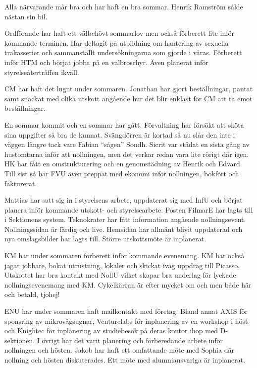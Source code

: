\documentclass[10pt]{article}
\begin{document}
\begin{paragrafer}
\begin{fyllnadsval}
\end{fyllnadsval}

\begin{paragrafer}
Alla närvarande mår bra och har haft en bra sommar. Henrik Ramström sålde nästan sin bil. 

Ordförande har haft ett välbehövt sommarlov men också förberett lite inför kommande terminen. 
Har deltagit på utbildning om hantering av sexuella trakasserier och sammanställt undersökningarna som gjorde i våras. 
Förberett inför HTM och börjat jobba på en valbroschyr. Även planerat inför styrelseåterträffen ikväll. 

CM har haft det lugnt under sommaren. Jonathan har gjort beställningar, pantat samt 
snackat med olika utskott angående hur det blir enklast för CM att ta emot beställningar.

En sommar kommit och en sommar har gått. Förvaltning har försökt att sköta sina uppgifter så bra de kunnat. Svängdörren är kortad så nu slår den inte i väggen längre tack vare Fabian “sågen” Sondh. 
Sicrit var städat en sista gång av hustomtarna inför att nollningen, men det verkar redan vara lite rörigt där igen. HK har fått en omstrukturering och en genomstädning av Henrik och Edvard. 
Till sist så har FVU även preppat med ekonomi inför nollningen, bokfört och fakturerat. 

Mattias har satt sig in i styrelsens arbete, uppdaterat sig med InfU och börjat planera inför kommande utskott- och styrelsearbete. Posten FilmarE har lagts till i Sektionens system. Teknokrater har fått information angående nollningsevent. Nollningssidan är färdig och live. Hemsidan har allmänt blivit uppdaterad och nya omslagsbilder har lagts till. Större utskottsmöte är inplanerat. 

KM har under sommaren förberett inför kommande evenemang. KM har också jagat jobbare, bokat utrustning, lokaler och skickat iväg uppdrag till Picasso. 
Utskottet har bra kontakt med NollU vilket skapar bra underlag för lyckade nollningsevenemang med KM. 
Cykelkärran är efter mycket om och men både här och betald, tjohej! 


ENU har under sommaren haft mailkontakt med företag. Bland annat AXIS för sponsring av mikrovågsugnar, Venturelabs för inplanering av en workshop i höst och Knightec för inplanering av studiebesök på deras kontor ihop med D-sektionen. 
I övrigt har det varit planering och förberedande arbete inför nollningen och hösten. 
Jakob har haft ett omfattande möte med Sophia där nollning och hösten diskuterades. Ett möte med alumniansvariga är inplanerat. 



\end{paragrafer}
\end{paragrafer}
\end{document}

